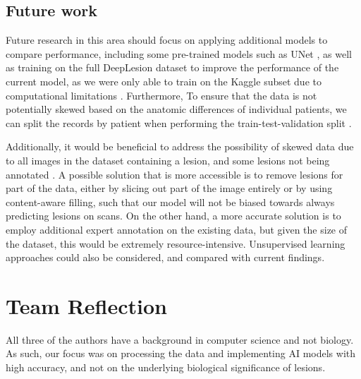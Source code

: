 \subsection{Future work}
Future research in this area should focus on applying additional models to compare performance, including some pre-trained models such as UNet \cite{unet}, as well as training on the full DeepLesion dataset to improve the performance of the current model, as we were only able to train on the Kaggle subset due to computational limitations \cite{kaggle}. Furthermore, To ensure that the data is not potentially skewed based on the anatomic differences of individual patients, we can split the records by patient when performing the train-test-validation split \cite{chollet_deep_learning}. 

Additionally, it would be beneficial to address the possibility of skewed data due to all images in the dataset containing a lesion, and some lesions not being annotated \cite{deeplesion}. A possible solution that is more accessible is to remove lesions for part of the data, either by slicing out part of the image entirely or by using content-aware filling, such that our model will not be biased towards always predicting lesions on scans. On the other hand, a more accurate solution is to employ additional expert annotation on the existing data, but given the size of the dataset, this would be extremely resource-intensive. Unsupervised learning approaches could also be considered, and compared with current findings.


\section*{Team Reflection}
All three of the authors have a background in computer science and not biology. As such, our focus was on processing the data and implementing AI models with high accuracy, and not on the underlying biological significance of lesions.




\vfill


%
%

